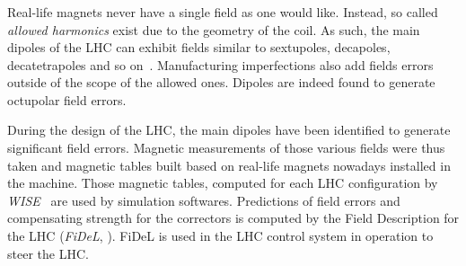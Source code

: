 \subsubsection{}

Real-life magnets never have a single field as one would like. Instead, so called 
\textit{allowed harmonics} exist due to the geometry of the coil. As such, the main dipoles of the
LHC can exhibit fields similar to sextupoles, decapoles, decatetrapoles and so
on~\cite{deniau_magnetic_2009}. Manufacturing imperfections also add fields errors outside of the
scope of the allowed ones. Dipoles are indeed found to generate octupolar field errors.

During the design of the LHC, the main dipoles have been identified to generate significant field
errors. Magnetic measurements of those various fields were thus taken and magnetic tables built
based on real-life magnets nowadays installed in the machine. Those magnetic tables, computed for
each LHC configuration by \textit{WISE}~\cite{p_hagen_wise_2006} are used by simulation softwares.
Predictions of field errors and compensating strength for the correctors is computed by the Field
Description for the LHC (\textit{FiDeL}, \cite{noauthor_fidel_2021}). FiDeL is used in the LHC
control system in operation to steer the LHC.

